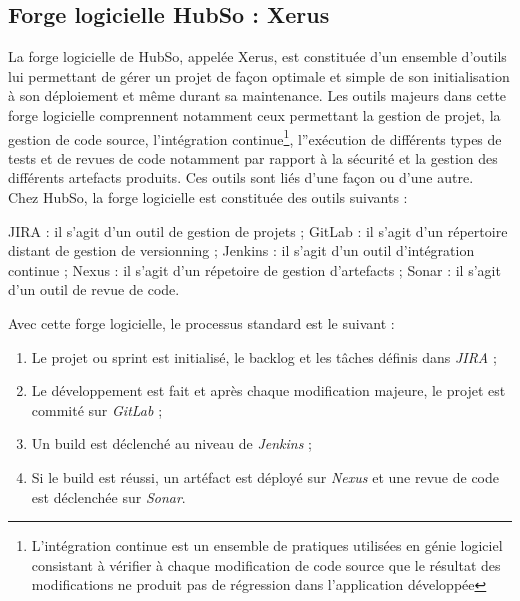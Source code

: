 \subsection{Forge logicielle HubSo : Xerus}
La forge logicielle de HubSo, appelée Xerus, est constituée d'un ensemble d'outils lui permettant de gérer un projet de façon optimale et simple de son initialisation à son déploiement et même durant sa maintenance. Les outils majeurs
dans cette forge logicielle comprennent notamment ceux permettant la gestion de projet, la gestion de code source, l'intégration continue\footnote{L'intégration continue est un ensemble de pratiques utilisées en génie logiciel consistant à vérifier à chaque modification de code source que le résultat des modifications ne produit pas de régression dans l'application développée}, l''exécution de différents types de tests et de revues de code notamment par rapport à la sécurité et  la gestion des différents artefacts produits. Ces outils sont liés d'une façon ou d'une autre.\\
Chez HubSo, la forge logicielle est constituée des outils suivants :
\begin{itemize}
	\itemcheck JIRA : il s'agit d'un outil de gestion de projets ;
	\itemcheck GitLab : il s'agit d'un répertoire distant de gestion de versionning ;
	\itemcheck Jenkins : il s'agit d'un outil d'intégration continue ;
	\itemcheck Nexus : il s'agit d'un répetoire de gestion d'artefacts ;
	\itemcheck Sonar : il s'agit d'un outil de revue de code. 
\end{itemize}
Avec cette forge logicielle, le processus standard est le suivant :
\begin{enumerate}
	\item Le projet ou sprint est initialisé, le backlog et les tâches définis dans \textit{JIRA} ;
	\item Le développement est fait et après chaque modification majeure, le projet est commité sur \textit{GitLab} ;
	\item Un build est déclenché au niveau de \textit{Jenkins} ;
	\item Si le build est réussi, un artéfact est déployé sur \textit{Nexus} et une revue de code est déclenchée sur \textit{Sonar}.
\end{enumerate}
